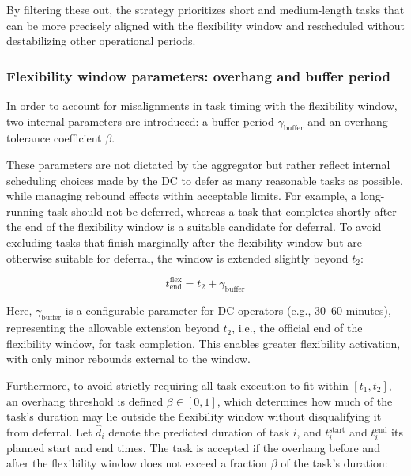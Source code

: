 \documentclass[preprint,12pt]{elsarticle}
\begin{document}
By filtering these out, the strategy prioritizes short and medium-length tasks that can be more precisely aligned with the flexibility window and rescheduled without destabilizing other operational periods.


\subsubsection{Flexibility window parameters: overhang and buffer period}


In order to account for misalignments in task timing with the flexibility window, two internal parameters are introduced: a buffer period $\gamma_{\text{buffer}}$ and an overhang tolerance coefficient $\beta$.

These parameters are not dictated by the aggregator but rather reflect internal scheduling choices made by the DC to defer as many reasonable tasks as possible, while managing rebound effects within acceptable limits. %
For example, a long-running task should not be deferred, whereas a task that completes shortly after the end of the flexibility window is a suitable candidate for deferral.
To avoid excluding tasks that finish marginally after the flexibility window but are otherwise suitable for deferral, the window is extended slightly beyond $t_2$:

\begin{equation}
    t_{\text{end}}^{\text{flex}} = t_2 + \gamma_{\text{buffer}}
\end{equation}

Here, $\gamma_{\text{buffer}}$ is a configurable parameter for DC operators (e.g., 30–60 minutes), representing the allowable extension beyond $t_2 $, i.e.,  the official end of the flexibility window, for task completion. This enables greater flexibility activation, with only minor rebounds external to the window.

Furthermore, to avoid strictly requiring all task execution to fit within $[t_1, t_2]$, an overhang threshold is defined $\beta \in [0, 1]$, which determines how much of the task's duration may lie outside the flexibility window without disqualifying it from deferral. Let $\hat{d}_i$ denote the predicted duration of task $i$, and $t_i^{\text{start}}$ and $t_i^{\text{end}}$ its planned start and end times. The task is accepted if the overhang before and after the flexibility window does not exceed a fraction $\beta$ of the task's duration:
\end{document}
